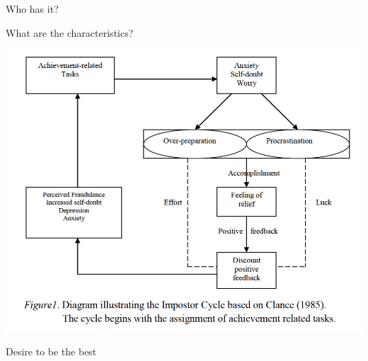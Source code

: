 \documentclass[aspectratio=169]{beamer}
\begin{document}
\begin{frame}
  \begin{center}
    \Huge Who has it?
    \\ \small \cite{clanceimes78}
  \end{center}
\end{frame}

\begin{frame}
  \begin{center}
    \Huge What are the characteristics?
  \end{center}
\end{frame}

\begin{frame}
  \begin{center}
    \includegraphics[scale=.5]{./assets/clance-impostor-cycle.png}
    \\ \small \cite{sakulku11}
  \end{center}
\end{frame}

\begin{frame}
  \begin{center}
    \Huge Desire to be the best
    \\ \small \cite{sakulku11}
  \end{center}
\end{frame}
\end{document}
